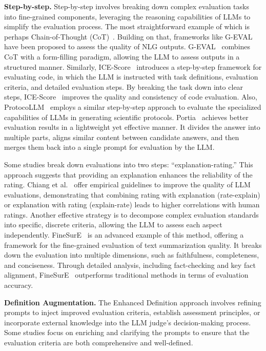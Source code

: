 \textbf{Step-by-step.}
Step-by-step involves breaking down complex evaluation tasks into fine-grained components, leveraging the reasoning capabilities of LLMs to simplify the evaluation process. The most straightforward example of which is perhaps Chain-of-Thought (CoT)~\cite{wei2022chain,kotonya2023little}. Building on that, frameworks like G-EVAL~\cite{liu2023g} have been proposed to assess the quality of NLG outputs. G-EVAL~\cite{liu2023g} combines CoT with a form-filling paradigm, allowing the LLM to assess outputs in a structured manner.
Similarly, ICE-Score~\cite{zhuo2023ice} introduces a step-by-step framework for evaluating code, in which the LLM is instructed with task definitions, evaluation criteria, and detailed evaluation steps. By breaking the task down into clear steps, ICE-Score~\cite{zhuo2023ice} improves the quality and consistency of code evaluation. Also, ProtocoLLM~\cite{yi2024protocollm} employs a similar step-by-step approach to evaluate the specialized capabilities of LLMs in generating scientific protocols. 
Portia~\cite{li2023split} achieves better evaluation results in a lightweight yet effective manner. It divides the answer into multiple parts, aligns similar content between candidate answers, and then merges them back into a single prompt for evaluation by the LLM.


Some studies break down evaluations into two steps: ``explanation-rating.'' This approach suggests that providing an explanation enhances the reliability of the rating. Chiang et al.~\cite{chiang2023closer} offer empirical guidelines to improve the quality of LLM evaluations, demonstrating that combining rating with explanation (rate-explain) or explanation with rating (explain-rate) leads to higher correlations with human ratings.
Another effective strategy is to decompose complex evaluation standards into specific, discrete criteria, allowing the LLM to assess each aspect independently. FineSurE~\cite{song2024finesure} is an advanced example of this method, offering a framework for the fine-grained evaluation of text summarization quality. It breaks down the evaluation into multiple dimensions, such as faithfulness, completeness, and conciseness. Through detailed analysis, including fact-checking and key fact alignment, FineSurE~\cite{song2024finesure} outperforms traditional methods in terms of evaluation accuracy.




\textbf{Definition Augmentation.}
The Enhanced Definition approach involves refining prompts to inject improved evaluation criteria, establish assessment principles, or incorporate external knowledge into the LLM judge's decision-making process.
Some studies focus on enriching and clarifying the prompts to ensure that the evaluation criteria are both comprehensive and well-defined.



